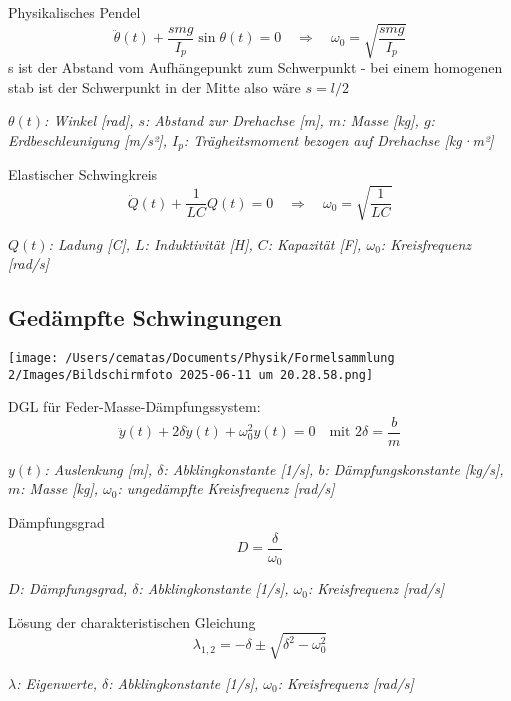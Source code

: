 \documentclass[a4paper,10pt]{article}
\newenvironment{displayformula}
{
	\begin{framed}
		\color{formulaColor}
	}
	{\end{framed}}
\newcommand{\formulalegend}[1]{%
	\par\vspace{0.5ex}%
	{{\color{legendColor}\RaggedRight\small\textit{#1}}}%
	\par\vspace{1.5ex}%
}
\begin{document}
\begin{displayformula}
	Physikalisches Pendel
	\[
	\ddot{\theta}(t) + \frac{s m g}{I_p} \sin\theta(t) = 0
	\quad \Rightarrow \quad \omega_0 = \sqrt{\frac{s m g}{I_p}}
	\]
	s ist der Abstand vom Aufhängepunkt zum Schwerpunkt - bei einem homogenen stab ist der Schwerpunkt in der Mitte also wäre $s = l/2$
\end{displayformula}
\formulalegend{
	\( \theta(t) \): Winkel [rad], \( s \): Abstand zur Drehachse [m], \( m \): Masse [kg], \( g \): Erdbeschleunigung [m/s²], \( I_p \): Trägheitsmoment bezogen auf Drehachse [kg·m²]
}

\begin{displayformula}
	Elastischer Schwingkreis
	\[
	\ddot{Q}(t) + \frac{1}{LC} Q(t) = 0
	\quad \Rightarrow \quad \omega_0 = \sqrt{\frac{1}{LC}}
	\]
\end{displayformula}
\formulalegend{
	\( Q(t) \): Ladung [C], \( L \): Induktivität [H], \( C \): Kapazität [F], \( \omega_0 \): Kreisfrequenz [rad/s]
}


\subsection{Gedämpfte Schwingungen}

\texttt{[image: /Users/cematas/Documents/Physik/Formelsammlung 2/Images/Bildschirmfoto 2025-06-11 um 20.28.58.png]}

\begin{displayformula}
	DGL für Feder-Masse-Dämpfungssystem:
	\[
	\ddot{y}(t) + 2\delta \dot{y}(t) + \omega_0^2 y(t) = 0
	\quad \text{mit } 2\delta = \frac{b}{m}
	\]
\end{displayformula}
\formulalegend{
	\( y(t) \): Auslenkung [m], \( \delta \): Abklingkonstante [1/s], \( b \): Dämpfungskonstante [kg/s], \( m \): Masse [kg], \( \omega_0 \): ungedämpfte Kreisfrequenz [rad/s]
}

\begin{displayformula}
	Dämpfungsgrad
	\[
	D = \frac{\delta}{\omega_0}
	\]
\end{displayformula}
\formulalegend{
	\( D \): Dämpfungsgrad, \( \delta \): Abklingkonstante [1/s], \( \omega_0 \): Kreisfrequenz [rad/s]
}

\begin{displayformula}
	Lösung der charakteristischen Gleichung
	\[
	\lambda_{1,2} = -\delta \pm \sqrt{\delta^2 - \omega_0^2}
	\]
\end{displayformula}
\formulalegend{
	\( \lambda \): Eigenwerte, \( \delta \): Abklingkonstante [1/s], \( \omega_0 \): Kreisfrequenz [rad/s]
}
\end{document}
